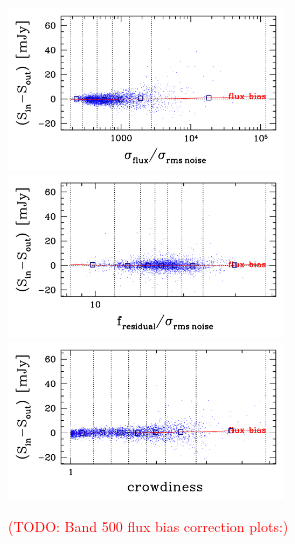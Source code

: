 \documentclass[11pt,a4paper]{article}
\begin{document}
\begin{figure}[H]
	\caption{
		\textcolor{red}{(TODO: Band 500 flux bias correction plots:)}
	}
	\includegraphics[width=0.65\textwidth]{galsim_500_fbias_1}
	\includegraphics[width=0.65\textwidth]{galsim_500_fbias_2}
	\includegraphics[width=0.65\textwidth]{galsim_500_fbias_3}
\end{figure}
\end{document}
